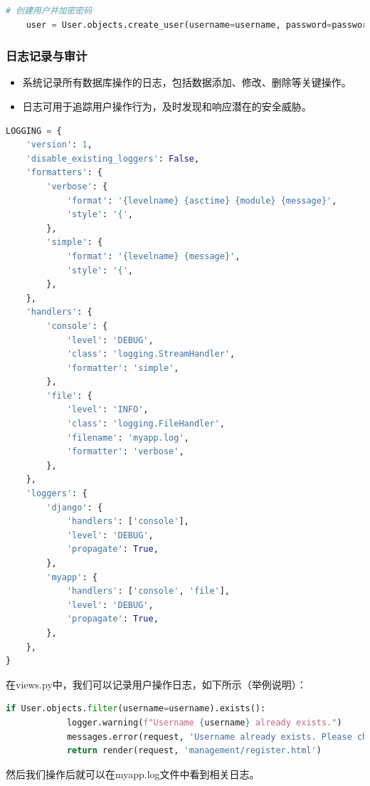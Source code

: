 \documentclass[UTF8,a4paper,12pt]{ctexart}
\begin{document}
\begin{lstlisting}[language=python]
    # 创建用户并加密密码
    user = User.objects.create_user(username=username, password=password)
\end{lstlisting}

\subsubsection{日志记录与审计}
\begin{itemize}
    \item 系统记录所有数据库操作的日志，包括数据添加、修改、删除等关键操作。
    \item 日志可用于追踪用户操作行为，及时发现和响应潜在的安全威胁。
\end{itemize}

\begin{lstlisting}[language=python]
    LOGGING = {
    'version': 1,
    'disable_existing_loggers': False,
    'formatters': {
        'verbose': {
            'format': '{levelname} {asctime} {module} {message}',
            'style': '{',
        },
        'simple': {
            'format': '{levelname} {message}',
            'style': '{',
        },
    },
    'handlers': {
        'console': {
            'level': 'DEBUG',
            'class': 'logging.StreamHandler',
            'formatter': 'simple',
        },
        'file': {
            'level': 'INFO',
            'class': 'logging.FileHandler',
            'filename': 'myapp.log',
            'formatter': 'verbose',
        },
    },
    'loggers': {
        'django': {
            'handlers': ['console'],
            'level': 'DEBUG',
            'propagate': True,
        },
        'myapp': {
            'handlers': ['console', 'file'],
            'level': 'DEBUG',
            'propagate': True,
        },
    },
}
\end{lstlisting}

在views.py中，我们可以记录用户操作日志，如下所示（举例说明）：

\begin{lstlisting}[language=python]
    if User.objects.filter(username=username).exists():
            logger.warning(f"Username {username} already exists.")
            messages.error(request, 'Username already exists. Please choose another one.')
            return render(request, 'management/register.html')
\end{lstlisting}

然后我们操作后就可以在myapp.log文件中看到相关日志。
\end{document}

